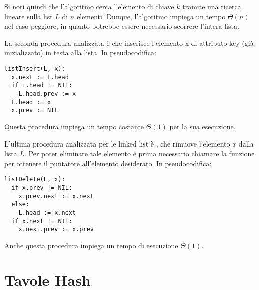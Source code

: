 Si noti quindi che l'algoritmo  cerca l'elemento di chiave \(k\) tramite una ricerca lineare sulla list \(L\) di \(n\) elementi. Dunque, l'algoritmo impiega un tempo \(\Theta(n)\) nel caso peggiore, in quanto potrebbe essere necessario scorrere l'intera lista.

\vspace{10pt}

La seconda procedura analizzata è  che inserisce l'elemento x di attributo key (già inizializzato) in testa alla lista. In pseudocodifica:

\begin{lstlisting}
listInsert(L, x):
  x.next := L.head
  if L.head != NIL:
    L.head.prev := x
  L.head := x
  x.prev := NIL 
\end{lstlisting}

Questa procedura impiega un tempo costante \(\Theta(1)\) per la sua esecuzione.

\vspace{10pt}

L'ultima procedura analizzata per le linked list è , che rimuove l'elemento \(x\) dalla lista \(L\). Per poter eliminare tale elemento è prima necessario chiamare la funzione  per ottenere il puntatore all'elemento desiderato. In pseudocodifica:

\begin{lstlisting}
listDelete(L, x):
  if x.prev != NIL:
    x.prev.next := x.next
  else:
    L.head := x.next
  if x.next != NIL:
    x.next.prev := x.prev
\end{lstlisting}

Anche questa procedura impiega un tempo di esecuzione \(\Theta(1)\).

\section{Tavole Hash}

